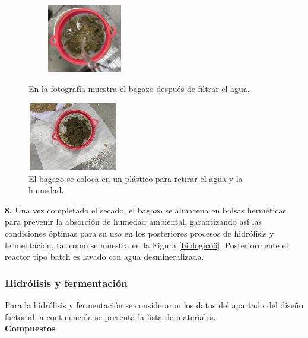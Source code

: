 \documentclass[12pt]{article}
\begin{document}
	
		\begin{figure}[H]
		\centering
		\begin{minipage}{0.46\textwidth}
			\centering
			\includegraphics[width=5cm, height=3cm]{imagenes/enjuagado} %
			\caption{En la fotografía muestra el bagazo después de filtrar el agua.}
			\label{enjuagado}
		\end{minipage}
		\hfill
		\begin{minipage}{0.48\textwidth}
			\centering
			\includegraphics[width=4cm, height=3cm]{imagenes/secado6} %
			\caption{El bagazo se coloca en un plástico para retirar el agua y la humedad.}
			\label{biologico4}
		\end{minipage}
	\end{figure}
	
	
	
	
	
	 \textbf{8.} Una vez completado el secado, el bagazo se almacena en bolsas herméticas para prevenir la absorción de humedad ambiental, garantizando así las condiciones óptimas para su uso en los posteriores procesos de hidrólisis y fermentación, tal como se muestra en la Figura \ref{biologico6}. Posteriormente el reactor tipo batch es lavado con agua desmineralizada.
	
	

			
				\subsubsection{Hidrólisis y fermentación}
				
			Para la hidrólisis y fermentación se consideraron los datos del apartado del diseño factorial, a continuación se presenta la lista de materiales.
			\\
					 \textbf{Compuestos} \\[0.5em]
					 
\end{document}
